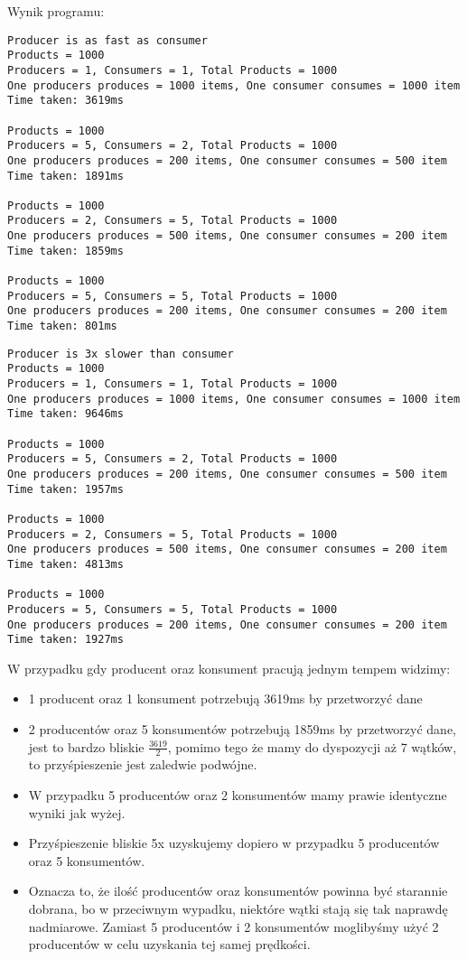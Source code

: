 \documentclass[11pt]{article}
\begin{document}
Wynik programu:
\begin{tcolorbox}
\begin{Verbatim}
Producer is as fast as consumer
Products = 1000
Producers = 1, Consumers = 1, Total Products = 1000
One producers produces = 1000 items, One consumer consumes = 1000 item
Time taken: 3619ms

Products = 1000
Producers = 5, Consumers = 2, Total Products = 1000
One producers produces = 200 items, One consumer consumes = 500 item
Time taken: 1891ms

Products = 1000
Producers = 2, Consumers = 5, Total Products = 1000
One producers produces = 500 items, One consumer consumes = 200 item
Time taken: 1859ms

Products = 1000
Producers = 5, Consumers = 5, Total Products = 1000
One producers produces = 200 items, One consumer consumes = 200 item
Time taken: 801ms
\end{Verbatim}


\end{tcolorbox}\begin{tcolorbox}
\begin{Verbatim}
Producer is 3x slower than consumer
Products = 1000
Producers = 1, Consumers = 1, Total Products = 1000
One producers produces = 1000 items, One consumer consumes = 1000 item
Time taken: 9646ms

Products = 1000
Producers = 5, Consumers = 2, Total Products = 1000
One producers produces = 200 items, One consumer consumes = 500 item
Time taken: 1957ms

Products = 1000
Producers = 2, Consumers = 5, Total Products = 1000
One producers produces = 500 items, One consumer consumes = 200 item
Time taken: 4813ms

Products = 1000
Producers = 5, Consumers = 5, Total Products = 1000
One producers produces = 200 items, One consumer consumes = 200 item
Time taken: 1927ms
\end{Verbatim}


\end{tcolorbox}W przypadku gdy producent oraz konsument pracują jednym tempem widzimy:
\begin{itemize}
\item 1 producent oraz 1 konsument potrzebują 3619ms by przetworzyć dane
\item 2 producentów oraz 5 konsumentów potrzebują 1859ms by przetworzyć dane,
jest to bardzo bliskie \(\frac{3619}{2}\), pomimo tego że mamy do dyspozycji aż 7 wątków,
to przyśpieszenie jest zaledwie podwójne.
\item W przypadku 5 producentów oraz 2 konsumentów mamy prawie identyczne wyniki jak
wyżej.
\item Przyśpieszenie bliskie 5x uzyskujemy dopiero w przypadku 5 producentów oraz 5 konsumentów.
\item Oznacza to, że ilość producentów oraz konsumentów powinna być starannie dobrana, bo w
przeciwnym wypadku, niektóre wątki stają się tak naprawdę nadmiarowe.
Zamiast 5 producentów i 2 konsumentów moglibyśmy użyć 2 producentów w celu uzyskania
tej samej prędkości.
\end{itemize}
\end{document}
